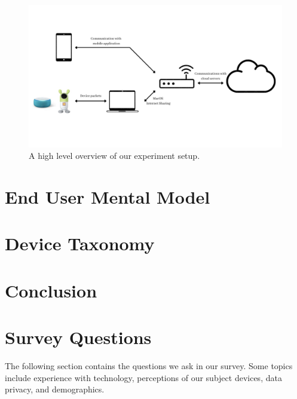 \documentclass[12pt]{ucthesis}
\begin{document}
\begin{figure}
    \includegraphics[width=\textwidth]{experiment.jpg}
    \caption{A high level overview of our experiment setup.}
\end{figure}

\chapter{End User Mental Model}
\label{ch:mental}


\chapter{Device Taxonomy}
\label{ch:taxonomy}


\chapter{Conclusion}
\label{ch:conclusion}


\nocite{*}




\appendix
\chapter{Survey Questions}
The following section contains the questions we ask in our survey. Some topics include experience with technology, perceptions of our subject devices, data privacy, and demographics.
\end{document}
